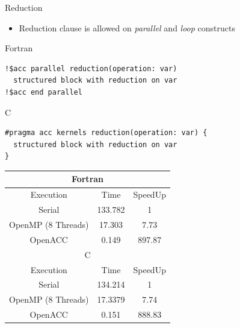\documentclass[c,mathserif,compress,xcolor=svgnames]{beamer}
\newenvironment{eblock}[0]
{
\begin{beamerboxesrounded}[upper=uppercol2,lower=lowercol2,shadow=true]}
{\end{beamerboxesrounded}}
\begin{document}
\begin{frame}{\small Reduction}
  \begin{itemize}
    \item Reduction clause is allowed on \textit{parallel} and \textit{loop} constructs
  \end{itemize}
  \begin{eblock}{Fortran}
    \begin{lstlisting}[basicstyle=\tiny\ttfamily,language=OmpFortran]
!$acc parallel reduction(operation: var)
  structured block with reduction on var
!$acc end parallel
    \end{lstlisting}
  \end{eblock}
  \begin{eblock}{C}
    \begin{lstlisting}[basicstyle=\tiny\ttfamily,language=OmpC]
#pragma acc kernels reduction(operation: var) {
  structured block with reduction on var
}
    \end{lstlisting}
  \end{eblock}

  \begin{eblock}{}
    \begin{center}
      \begin{tabular}{|c|c|c|}
        \hline
        \multicolumn{3}{|c|}{Fortran}\\
        \hline
        Execution & Time & SpeedUp \\
        \hline
        Serial & 133.782 & 1 \\
        OpenMP (8 Threads) & 17.303 & 7.73 \\
        OpenACC & 0.149 & 897.87 \\
        \hline
        \multicolumn{3}{|c|}{C}\\
        \hline
        Execution & Time & SpeedUp \\
        \hline
        Serial & 134.214 & 1 \\
        OpenMP (8 Threads) & 17.3379 & 7.74 \\
        OpenACC & 0.151 & 888.83 \\
        \hline
        
      \end{tabular}
    \end{center}
  \end{eblock}
\end{frame}
\end{document}
